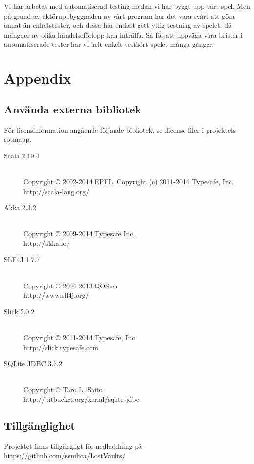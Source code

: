 \documentclass[a4paper]{article}
\begin{document}
Vi har arbetat med automatiserad testing medan vi har byggt upp vårt spel. Men på grund av aktöruppbyggnaden av vårt program har det vara svårt att göra annat än enhetstester, och dessa har endast gett ytlig testning av spelet, då mängder av olika händelseförlopp kan inträffa. Så för att uppväga våra brister i automatiserade tester har vi helt enkelt testkört spelet många gånger. 

\section{Appendix}
\subsection{Använda externa bibliotek}
För licensinformation angående följande bibliotek, se .license filer i projektets rotmapp.
\begin{description}
\item[Scala 2.10.4] \hfill \\ Copyright © 2002-2014 EPFL, Copyright (c) 2011-2014 Typesafe, Inc.\hfill \\http://scala-lang.org/
\item[Akka 2.3.2] \hfill \\ Copyright © 2009-2014 Typesafe Inc.\hfill \\ http://akka.io/
\item[SLF4J 1.7.7] \hfill \\ Copyright © 2004-2013 QOS.ch\hfill \\ http://www.slf4j.org/
\item[Slick 2.0.2] \hfill \\ Copyright © 2011-2014 Typesafe, Inc.\hfill \\ http://slick.typesafe.com
\item[SQLite JDBC 3.7.2] \hfill \\ Copyright © Taro L. Saito\hfill \\ http://bitbucket.org/xerial/sqlite-jdbc
\end{description}

\subsection{Tillgänglighet}
Projektet finns tillgängligt för nedladdning på https://github.com/senilica/LostVaults/
\end{document}
